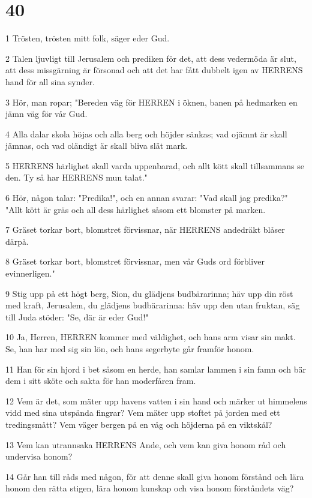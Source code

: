\chapter{40}

\par 1 Trösten, trösten mitt folk, säger eder Gud.
\par 2 Talen ljuvligt till Jerusalem och prediken för det, att dess vedermöda är slut, att dess missgärning är försonad och att det har fått dubbelt igen av HERRENS hand för all sina synder.
\par 3 Hör, man ropar; "Bereden väg för HERREN i öknen, banen på hedmarken en jämn väg för vår Gud.
\par 4 Alla dalar skola höjas och alla berg och höjder sänkas; vad ojämnt är skall jämnas, och vad oländigt är skall bliva slät mark.
\par 5 HERRENS härlighet skall varda uppenbarad, och allt kött skall tillsammans se den. Ty så har HERRENS mun talat."
\par 6 Hör, någon talar: "Predika!", och en annan svarar: "Vad skall jag predika?" "Allt kött är gräs och all dess härlighet såsom ett blomster på marken.
\par 7 Gräset torkar bort, blomstret förvissnar, när HERRENS andedräkt blåser därpå.
\par 8 Gräset torkar bort, blomstret förvissnar, men vår Guds ord förbliver evinnerligen."
\par 9 Stig upp på ett högt berg, Sion, du glädjens budbärarinna; häv upp din röst med kraft, Jerusalem, du glädjens budbärarinna: häv upp den utan fruktan, säg till Juda stöder: "Se, där är eder Gud!"
\par 10 Ja, Herren, HERREN kommer med väldighet, och hans arm visar sin makt. Se, han har med sig sin lön, och hans segerbyte går framför honom.
\par 11 Han för sin hjord i bet såsom en herde, han samlar lammen i sin famn och bär dem i sitt sköte och sakta för han moderfåren fram.
\par 12 Vem är det, som mäter upp havens vatten i sin hand och märker ut himmelens vidd med sina utspända fingrar? Vem mäter upp stoftet på jorden med ett tredingsmått? Vem väger bergen på en våg och höjderna på en viktskål?
\par 13 Vem kan utrannsaka HERRENS Ande, och vem kan giva honom råd och undervisa honom?
\par 14 Går han till råds med någon, för att denne skall giva honom förstånd och lära honom den rätta stigen, lära honom kunskap och visa honom förståndets väg?
